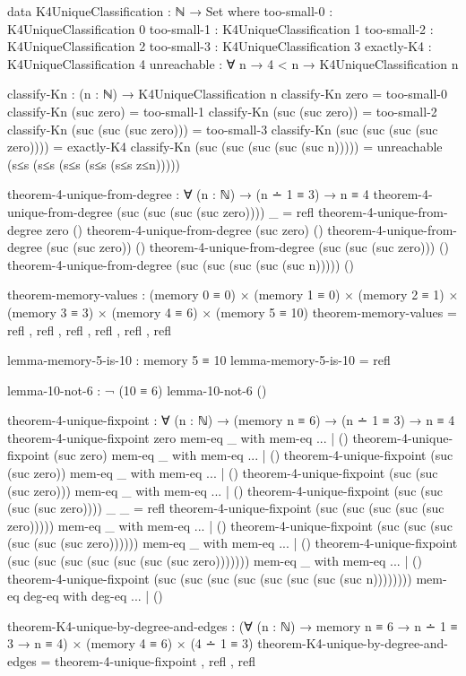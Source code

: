 \documentclass[11pt,a4paper]{book}
\begin{document}
\begin{code}
data K4UniqueClassification : ℕ → Set where
  too-small-0  : K4UniqueClassification 0
  too-small-1  : K4UniqueClassification 1
  too-small-2  : K4UniqueClassification 2  
  too-small-3  : K4UniqueClassification 3
  exactly-K4   : K4UniqueClassification 4
  unreachable  : ∀ {n} → 4 < n → K4UniqueClassification n

classify-Kn : (n : ℕ) → K4UniqueClassification n
classify-Kn zero = too-small-0
classify-Kn (suc zero) = too-small-1
classify-Kn (suc (suc zero)) = too-small-2
classify-Kn (suc (suc (suc zero))) = too-small-3
classify-Kn (suc (suc (suc (suc zero)))) = exactly-K4
classify-Kn (suc (suc (suc (suc (suc n))))) = unreachable (s≤s (s≤s (s≤s (s≤s (s≤s z≤n)))))

theorem-4-unique-from-degree : ∀ (n : ℕ) → 
  (n ∸ 1 ≡ 3) →
  n ≡ 4
theorem-4-unique-from-degree (suc (suc (suc (suc zero)))) _ = refl
theorem-4-unique-from-degree zero ()
theorem-4-unique-from-degree (suc zero) ()
theorem-4-unique-from-degree (suc (suc zero)) ()
theorem-4-unique-from-degree (suc (suc (suc zero))) ()
theorem-4-unique-from-degree (suc (suc (suc (suc (suc n))))) ()

theorem-memory-values : (memory 0 ≡ 0) × (memory 1 ≡ 0) × (memory 2 ≡ 1) × 
                        (memory 3 ≡ 3) × (memory 4 ≡ 6) × (memory 5 ≡ 10)
theorem-memory-values = refl , refl , refl , refl , refl , refl

lemma-memory-5-is-10 : memory 5 ≡ 10
lemma-memory-5-is-10 = refl

lemma-10-not-6 : ¬ (10 ≡ 6)
lemma-10-not-6 ()

theorem-4-unique-fixpoint : ∀ (n : ℕ) → 
  (memory n ≡ 6) →
  (n ∸ 1 ≡ 3) →
  n ≡ 4
theorem-4-unique-fixpoint zero mem-eq _ with mem-eq
... | ()
theorem-4-unique-fixpoint (suc zero) mem-eq _ with mem-eq
... | ()
theorem-4-unique-fixpoint (suc (suc zero)) mem-eq _ with mem-eq  
... | ()
theorem-4-unique-fixpoint (suc (suc (suc zero))) mem-eq _ with mem-eq
... | ()
theorem-4-unique-fixpoint (suc (suc (suc (suc zero)))) _ _ = refl
theorem-4-unique-fixpoint (suc (suc (suc (suc (suc zero))))) mem-eq _ with mem-eq
... | ()
theorem-4-unique-fixpoint (suc (suc (suc (suc (suc (suc zero)))))) mem-eq _ with mem-eq
... | ()
theorem-4-unique-fixpoint (suc (suc (suc (suc (suc (suc (suc zero))))))) mem-eq _ with mem-eq
... | ()
theorem-4-unique-fixpoint (suc (suc (suc (suc (suc (suc (suc (suc n)))))))) mem-eq deg-eq 
  with deg-eq
... | ()

theorem-K4-unique-by-degree-and-edges : 
  (∀ (n : ℕ) → memory n ≡ 6 → n ∸ 1 ≡ 3 → n ≡ 4) × (memory 4 ≡ 6) × (4 ∸ 1 ≡ 3)
theorem-K4-unique-by-degree-and-edges = theorem-4-unique-fixpoint , refl , refl
\end{code}
\end{document}
